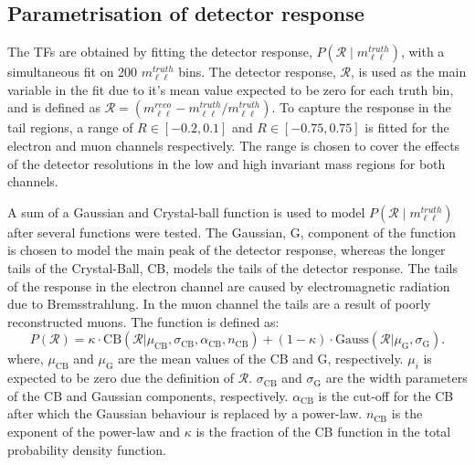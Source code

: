 \subsection{Parametrisation of detector response}
The TFs are obtained by fitting the detector response, $P(\mathcal{R} \mid m_{\ell\ell}^{truth})$, with a simultaneous fit on 200 $m_{\ell\ell}^{truth}$ bins. The detector response, $\mathcal{R}$, is used as the main variable in the fit due to it's mean value expected to be zero for each truth bin, and is defined as $\mathcal{R} = (m_{\ell\ell}^{reco} - m_{\ell\ell}^{truth}/ m_{\ell\ell}^{truth})$. To capture the response in the tail regions, a range of $R \in [-0.2,0.1]$ and $R \in [-0.75,0.75]$ is fitted for the electron and muon channels respectively. The range is chosen to cover the effects of the detector resolutions in the low and high invariant mass regions for both channels. 

A sum of a Gaussian and Crystal-ball function is used to model $P(\mathcal{R} \mid m_{\ell\ell}^{truth})$ after several functions were tested. The Gaussian, G, component of the function is chosen to model the main peak of the detector response, whereas the longer tails of the Crystal-Ball, CB, models the tails of the detector response. The tails of the response in the electron channel are caused by electromagnetic radiation due to Bremsstrahlung. In the muon channel the tails are a result of poorly reconstructed muons. The function is defined as: 
\begin{equation}\label{eq:TF_responseParam}
    P(\mathcal{R}) = \kappa \cdot \mathrm{CB}(\mathcal{R}| \mu_\mathrm{CB}, \sigma_\mathrm{CB}, \alpha_\mathrm{CB}, n_\mathrm{CB}) + (1 - \kappa) \cdot \mathrm{Gauss}(\mathcal{R}| \mu_\mathrm{G}, \sigma_\mathrm{G}).
\end{equation}
where,  $\mu_\mathrm{CB}$ and $\mu_\mathrm{G}$ are the mean values of the CB and G, respectively. $\mu_i$ is expected to be zero due the definition of $\mathcal{R}$. $\sigma_\mathrm{CB}$ and $\sigma_\mathrm{G}$ are the width parameters of the CB and Gaussian components, respectively. $\alpha_\mathrm{CB}$ is the cut-off for the CB after which the Gaussian behaviour is replaced by a power-law. $n_\mathrm{CB}$ is the exponent of the power-law and $\kappa$ is the fraction of the CB function in the total probability density function.

